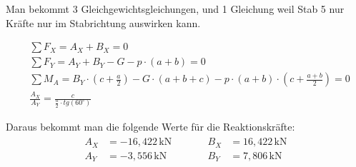 Man bekommt 3 Gleichgewichtsgleichungen, und 1 Gleichung weil Stab 5 nur Kräfte nur im Stabrichtung auswirken kann.

\begin{align}
  &\sum F_X = A_X + B_X = 0 \\
  &\sum F_Y = A_Y + B_Y - G - p \cdot (a + b) = 0 \\
  &\sum M_A = B_Y \cdot (c + \frac{a}{2}) - G \cdot (a + b + c) - p \cdot (a + b) \cdot (c + \frac{a + b}{2}) = 0\\
  &\frac{A_X}{A_Y} = \frac{c}{\frac{a}{2} \cdot tg(60^\circ)}
\end{align}

Daraus bekommt man die folgende Werte für die Reaktionskräfte:
\begin{align*}
  \boxed{
    \begin{aligned}
      A_X &= -16{,}422 \, \text{kN} \\
      A_Y &= -3{,}556 \, \text{kN}
  \end{aligned}}
  &\qquad
  \boxed{
    \begin{aligned}
      B_X &= 16{,}422 \, \text{kN} \\
      B_Y &= 7{,}806 \, \text{kN}
  \end{aligned}}
\end{align*}
